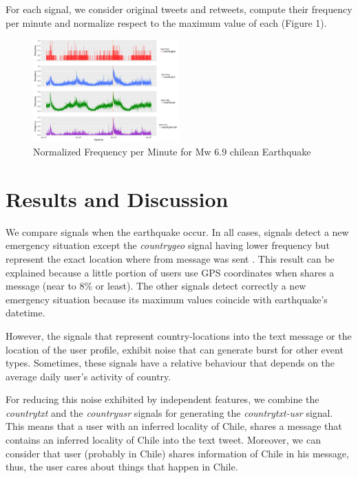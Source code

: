 \documentclass[letterpaper]{article} %
\begin{document}
For each signal, we consider original tweets and retweets, compute their frequency per minute and normalize respect to the maximum value of each (Figure 1).

\begin{figure}[h]
	
	\centering
	\includegraphics[width=0.5\textwidth]{freq_per_minute.png}
	\caption{Normalized Frequency per Minute for Mw 6.9 chilean Earthquake}
\end{figure}

\section{Results and Discussion}

We compare signals when the earthquake occur. In all cases, signals detect a new emergency situation except the \textit{countrygeo} signal having lower frequency but represent the exact location where from message was sent . This result can be explained because a little portion of users use GPS coordinates when shares a message (near to $8\%$ or least). The other signals detect correctly a new emergency situation because its maximum values coincide with earthquake's datetime.

However, the signals that represent country-locations into the text message or the location of the user profile, exhibit noise that can generate burst for other event types. Sometimes, these signals have a relative behaviour that depends on the average daily user's activity of country. 

For reducing this noise exhibited by independent features, we combine the \textit{countrytxt} and the \textit{countryusr} signals for generating the \textit{countrytxt-usr} signal. This means that a user with an inferred locality of Chile, shares a message that contains an inferred locality of Chile into the text tweet. Moreover, we can consider that user (probably in Chile) shares information of Chile in his message, thus, the user cares about things that happen in Chile.
\end{document}
